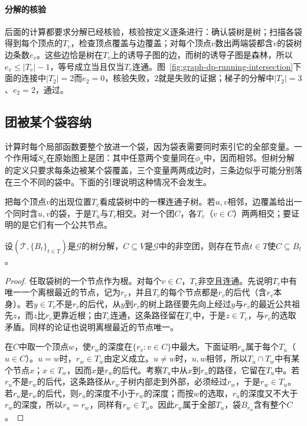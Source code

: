 \paragraph{分解的核验}
后面的计算都要求分解已经核验，核验按定义逐条进行：确认袋树是树；扫描各袋得到每个顶点的$T_v$，检查顶点覆盖与边覆盖；对每个顶点$v$数出两端袋都含$v$的袋树边条数$e_v$。这些边恰是树在$T_v$上的诱导子图的边，而树的诱导子图是森林，所以$e_v\leq|T_v|-1$，等号成立当且仅当$T_v$连通。图~\ref{fig:graph-dp-running-intersection}下面的连接中$|T_2|=2$而$e_2=0$，核验失败，$2$就是失败的证据；梯子的分解中$|T_2|=3$、$e_2=2$，通过。

\subsection{团被某个袋容纳}
\label{sec:graph-dp-clique-containment}

计算时每个局部函数要整个放进一个袋，因为袋表需要同时索引它的全部变量。一个作用域$S_a$在原始图上是团：其中任意两个变量同在$\phi_a$中，因而相邻。但树分解的定义只要求每条边被某个袋覆盖，三个变量两两成边时，三条边似乎可能分别落在三个不同的袋中。下面的引理说明这种情况不会发生。

把每个顶点$v$的出现位置$T_v$看成袋树中的一棵连通子树。若$u,v$相邻，边覆盖给出一个同时含$u,v$的袋，于是$T_u$与$T_v$相交。对一个团$C$，各$T_v$（$v\in C$）两两相交；要证明的是它们有一个公共节点。

\begin{lemma}[团被某个袋容纳]
\label{lem:graph-dp-clique-in-bag}
设$(\mathcal T,\{B_t\}_{t\in T})$是$\mathcal G$的树分解，$C\subseteq V$是$\mathcal G$中的非空团，则存在节点$t\in T$使$C\subseteq B_t$。
\end{lemma}

\begin{proof}
任取袋树的一个节点作为根。对每个$v\in C$，$T_v$非空且连通。先说明$T_v$中有唯一一个离根最近的节点，记为$r_v$，并且$T_v$的每个节点都是$r_v$的后代（含$r_v$本身）。若$y\in T_v$不是$r_v$的后代，从$y$到$r_v$的树上路径要先向上经过$y$与$r_v$的最近公共祖先$z$，而$z$比$r_v$更靠近根；由$T_v$连通，这条路径留在$T_v$中，于是$z\in T_v$，与$r_v$的选取矛盾。同样的论证也说明离根最近的节点唯一。

在$C$中取一个顶点$w$，使$r_w$的深度在$\{r_v:v\in C\}$中最大。下面证明$r_w$属于每个$T_u$（$u\in C$）。$u=w$时，$r_w\in T_w$由定义成立。$u\neq w$时，$u,w$相邻，所以$T_u\cap T_w$中有某个节点$x$；$x\in T_w$，因而$x$是$r_w$的后代。考察$T_u$中从$x$到$r_u$的路径，它留在$T_u$中。若$r_u$不是$r_w$的后代，这条路径从$r_w$子树内部走到外部，必须经过$r_w$，于是$r_w\in T_u$。若$r_u$是$r_w$的后代，则$r_u$的深度不小于$r_w$的深度；而按$w$的选取，$r_u$的深度又不大于$r_w$的深度，所以$r_u=r_w$，同样有$r_w\in T_u$。因此$r_w$属于全部$T_u$，袋$B_{r_w}$含有整个$C$。
\end{proof}

